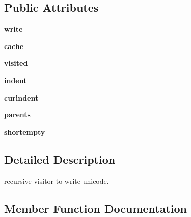 \subsection*{Public Attributes}
\begin{DoxyCompactItemize}
\item 
\mbox{\label{classpy_1_1__xmlgen_1_1_simple_unicode_visitor_ab69f2938ccc6118f54c1e5d075386ea0}} 
{\bfseries write}
\item 
\mbox{\label{classpy_1_1__xmlgen_1_1_simple_unicode_visitor_af215ec7c50bb17a49a805c641687f011}} 
{\bfseries cache}
\item 
\mbox{\label{classpy_1_1__xmlgen_1_1_simple_unicode_visitor_ad714bd2b69e4d635794dde9e897889aa}} 
{\bfseries visited}
\item 
\mbox{\label{classpy_1_1__xmlgen_1_1_simple_unicode_visitor_a45f93ae2a9637cfd1170bef059f91cc6}} 
{\bfseries indent}
\item 
\mbox{\label{classpy_1_1__xmlgen_1_1_simple_unicode_visitor_a514fbce1b0e39f3fe9683c1251144d74}} 
{\bfseries curindent}
\item 
\mbox{\label{classpy_1_1__xmlgen_1_1_simple_unicode_visitor_a694f044a1ec9ca6b8955c1c604d1ae7d}} 
{\bfseries parents}
\item 
\mbox{\label{classpy_1_1__xmlgen_1_1_simple_unicode_visitor_a118224504eebe6aef8d02615c5aab951}} 
{\bfseries shortempty}
\end{DoxyCompactItemize}


\subsection{Detailed Description}
\begin{DoxyVerb}recursive visitor to write unicode. \end{DoxyVerb}
 

\subsection{Member Function Documentation}
\mbox{\label{classpy_1_1__xmlgen_1_1_simple_unicode_visitor_a89d4b53fcfc7e80fcbab8dd6439b43fb}} 
